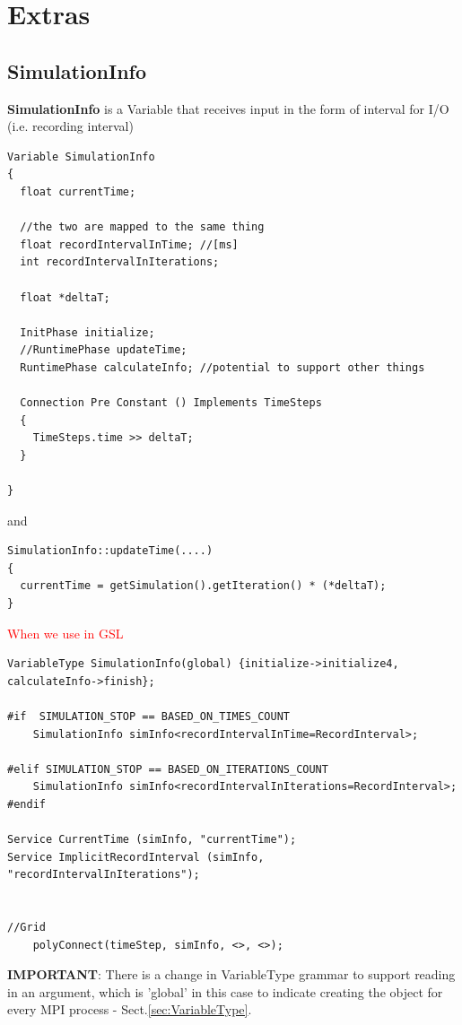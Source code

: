 \section{Extras}

\subsection{SimulationInfo}
\label{sec:SimulationInfo}

{\bf SimulationInfo} is a Variable that receives input in the form of interval
for I/O (i.e. recording interval)

\begin{verbatim}
Variable SimulationInfo
{
  float currentTime;
  
  //the two are mapped to the same thing
  float recordIntervalInTime; //[ms]
  int recordIntervalInIterations; 
    
  float *deltaT;
  
  InitPhase initialize;
  //RuntimePhase updateTime;
  RuntimePhase calculateInfo; //potential to support other things
  
  Connection Pre Constant () Implements TimeSteps
  {
    TimeSteps.time >> deltaT;
  }

}
\end{verbatim}
and

\begin{verbatim}
SimulationInfo::updateTime(....)
{
  currentTime = getSimulation().getIteration() * (*deltaT);
}
\end{verbatim}

\textcolor{red}{When we use in GSL}
\begin{verbatim}
VariableType SimulationInfo(global) {initialize->initialize4, calculateInfo->finish};

#if  SIMULATION_STOP == BASED_ON_TIMES_COUNT
    SimulationInfo simInfo<recordIntervalInTime=RecordInterval>;

#elif SIMULATION_STOP == BASED_ON_ITERATIONS_COUNT
    SimulationInfo simInfo<recordIntervalInIterations=RecordInterval>;
#endif

Service CurrentTime (simInfo, "currentTime"); 
Service ImplicitRecordInterval (simInfo, "recordIntervalInIterations"); 


//Grid
	polyConnect(timeStep, simInfo, <>, <>);

\end{verbatim}
{\bf IMPORTANT}: There is a change in VariableType grammar to support reading in
an argument, which is 'global' in this case to indicate creating the object for
every MPI process - Sect.\ref{sec:VariableType}.
